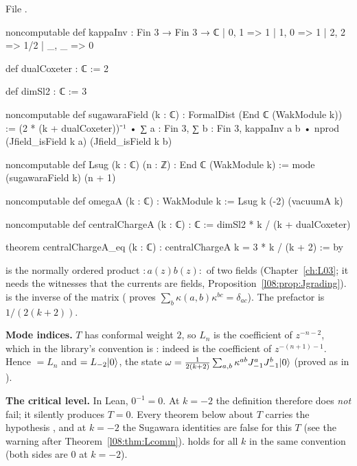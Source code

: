 \noindent File .
\begin{leancode}
noncomputable def kappaInv : Fin 3 → Fin 3 → ℂ
  | 0, 1 => 1
  | 1, 0 => 1
  | 2, 2 => 1/2
  | _, _ => 0

def dualCoxeter : ℂ := 2

def dimSl2 : ℂ := 3

noncomputable def sugawaraField (k : ℂ) : FormalDist (End ℂ (WakModule k)) :=
  (2 * (k + dualCoxeter))⁻¹ •
    ∑ a : Fin 3, ∑ b : Fin 3,
      kappaInv a b • nprod (Jfield_isField k a) (Jfield_isField k b)

noncomputable def Lsug (k : ℂ) (n : ℤ) : End ℂ (WakModule k) :=
  mode (sugawaraField k) (n + 1)

noncomputable def omegaA (k : ℂ) : WakModule k := Lsug k (-2) (vacuumA k)

noncomputable def centralChargeA (k : ℂ) : ℂ := dimSl2 * k / (k + dualCoxeter)

theorem centralChargeA_eq (k : ℂ) : centralChargeA k = 3 * k / (k + 2) := by
\end{leancode}

\begin{dictionary}
 is the normally ordered product ${:}a(z)b(z){:}$ of two fields
(Chapter~\ref{ch:L03}; it needs the witnesses  that the currents are fields,
Proposition~\ref{l08:prop:Jgrading}).  is the inverse of the matrix 
( proves $\sum_b\kappa(a,b)\kappa^{bc} = \delta_{ac}$). The prefactor
 is $1/(2(k+2))$.

\textbf{Mode indices.} $T$ has conformal weight $2$, so $L_n$ is the coefficient of $z^{-n-2}$, which
in the library's convention is : indeed  is the coefficient of
$z^{-(n+1)-1}$. Hence  $= L_n$ and  $= L_{-2}|0\rangle$, the state
$\omega = \frac{1}{2(k+2)}\sum_{a,b}\kappa^{ab}J^a_{-1}J^b_{-1}|0\rangle$ (proved as
 in ).

\textbf{The critical level.} In Lean, $0^{-1} = 0$. At $k=-2$ the definition therefore does
\emph{not} fail; it silently produces $T = 0$. Every theorem below about $T$ carries the hypothesis
, and at $k=-2$ the Sugawara identities are false for this $T$ (see the warning
after Theorem~\ref{l08:thm:Lcomm}).  holds for all $k$ in the same
convention (both sides are $0$ at $k=-2$).
\end{dictionary}

